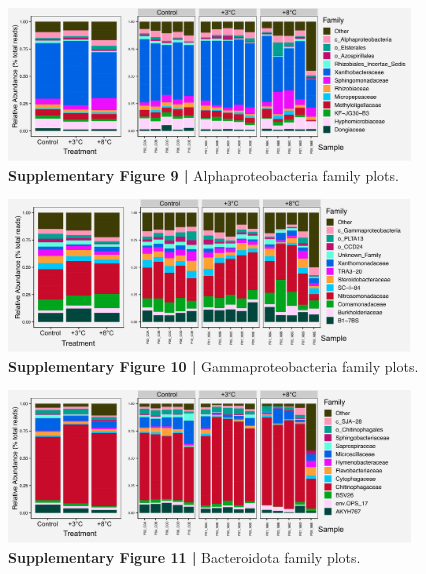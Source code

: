 \documentclass[
  10pt,
  letterpaper,
  DIV=11,
  numbers=noendperiod]{scrartcl}
\begin{document}
\begin{figure}

{\centering \includegraphics[width=0.95\textwidth,height=\textheight]{FIGURES/taxa_plots_class_Alpha.png}

}

\caption{\textbf{Supplementary Figure 9 |} Alphaproteobacteria family
plots.}

\end{figure}

\begin{figure}

{\centering \includegraphics[width=0.95\textwidth,height=\textheight]{FIGURES/taxa_plots_class_Gamma.png}

}

\caption{\textbf{Supplementary Figure 10 |} Gammaproteobacteria family
plots.}

\end{figure}

\begin{figure}

{\centering \includegraphics[width=0.95\textwidth,height=\textheight]{FIGURES/taxa_plots_class_Bacter.png}

}

\caption{\textbf{Supplementary Figure 11 |} Bacteroidota family plots.}

\end{figure}
\end{document}
